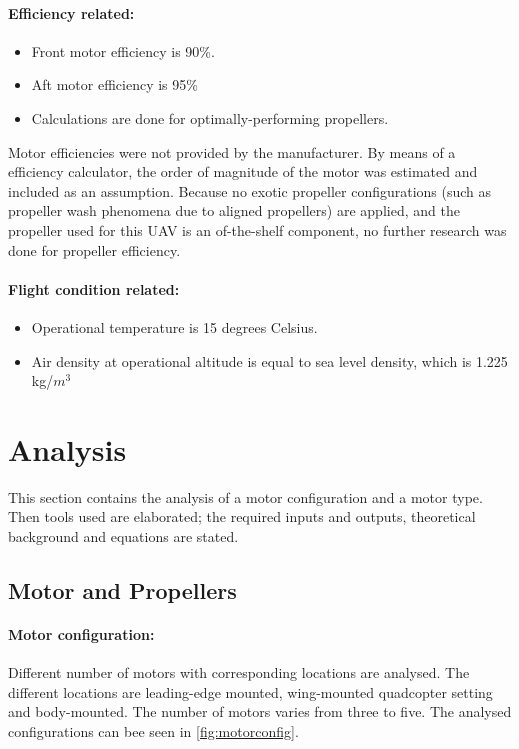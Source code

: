 \paragraph{Efficiency related:} 
\begin{itemize}
    \item Front motor efficiency is 90\%.
    \item Aft motor efficiency is 95\%
    \item Calculations are done for optimally-performing propellers.
\end{itemize}

\noindent Motor efficiencies were not provided by the manufacturer. By means of a efficiency calculator, the order of magnitude of the motor was estimated and included as an assumption. Because no exotic propeller configurations (such as propeller wash phenomena due to aligned propellers) are applied, and the propeller used for this UAV is an of-the-shelf component, no further research was done for propeller efficiency.  

\paragraph{Flight condition related:}
\begin{itemize}
    \item Operational temperature is 15 degrees Celsius. 
    \item Air density at operational altitude is equal to sea level density, which is 1.225 kg/$m^3$
\end{itemize}


\section{Analysis} %
\label{sec:AnalPNP}
This section contains the analysis of a motor configuration and a motor type. Then tools used are elaborated; the required inputs and outputs, theoretical background and equations are stated.

\subsection{Motor and Propellers}
\label{sec:MP}

\paragraph{Motor configuration:} Different number of motors with corresponding locations are analysed. The different locations are leading-edge mounted, wing-mounted quadcopter setting and body-mounted. The number of motors varies from three to five. The analysed configurations can bee seen in \autoref{fig:motorconfig}.

